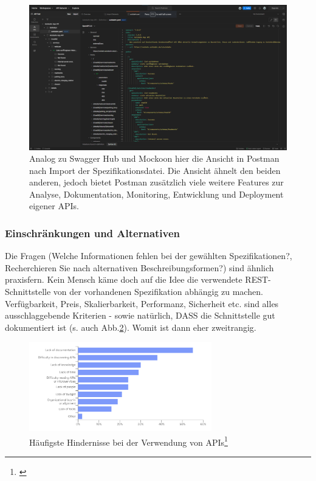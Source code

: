 \documentclass[notitlepage, hidelinks]{article}
\begin{document}
\begin{figure}[H]
\centering
  \includegraphics[width=\textwidth]{images/apispecs5.png}
  \caption{Analog zu Swagger Hub und Mockoon hier die Ansicht in Postman nach Import der Spezifikationsdatei. Die Ansicht ähnelt den beiden anderen, jedoch bietet Postman zusätzlich viele weitere Features zur Analyse, Dokumentation, Monitoring, Entwicklung und Deployment eigener APIs.}
  \label{apispecs5}
\end{figure}

\subsubsection{Einschränkungen und Alternativen}

Die Fragen (Welche Informationen fehlen bei der gewählten Spezifikationen?, Recherchieren Sie nach alternativen Beschreibungsformen?) sind ähnlich praxisfern. Kein Mensch käme doch auf die Idee die verwendete REST-Schnittstelle von der vorhandenen Spezifikation abhängig zu machen. Verfügbarkeit, Preis, Skalierbarkeit, Performanz, Sicherheit etc. sind alles ausschlaggebende Kriterien - sowie natürlich, DASS die Schnittstelle gut dokumentiert ist (s. auch Abb.\ref{stateofapiobstaclesconsumtion}). Womit ist dann eher zweitrangig. 

\begin{figure}[H]
\centering
  \includegraphics[width=300px]{images/stateofapiobstaclesconsumtion.png}
  \caption{Häufigste Hindernisse bei der Verwendung von APIs\protect\footnote{\cite{api-postman}}}
  \label{stateofapiobstaclesconsumtion}
\end{figure}
\end{document}
